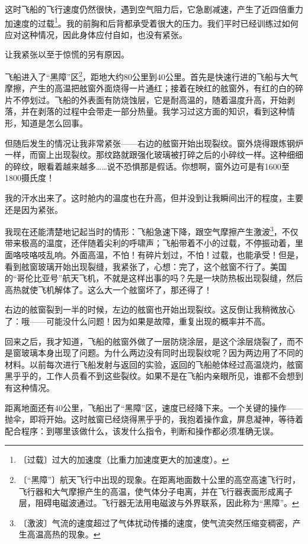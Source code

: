 \documentclass[12pt,UTF-8,openany]{ctexbook}
\begin{document}
\begin{large}
    这时飞船的飞行速度仍然很快，遇到空气阻力后，它急剧减速，产生了近四倍重力加速度的过载\footnote{〔过载〕过大的加速度（比重力加速度更大的加速度）。}。我的前胸和后背都承受着很大的压力。我们平时已经训练过如何应对这种情况，因此身体应付自如，也没有紧张。
    
    让我紧张以至于惊慌的另有原因。
    
    飞船进入了“黑障”区\footnote{〔“黑障”〕航天飞行中出现的现象。在距离地面数十公里的高空高速飞行时，飞行器和大气摩擦产生的高温，使气体分子电离，并在飞行器表面形成离子层，阻碍电磁波通过。飞行器无法用电磁波与外界联系，因此称为“黑障”。}，距地大约80公里到40公里。首先是快速行进的飞船与大气摩擦，产生的高温把舷窗外面烧得一片通红；接着在映红的舷窗外，有红的白的碎片不停划过。飞船的外表面有防烧蚀层，它是耐高温的，随着温度升高，开始剥落，并在剥落的过程中会带走一部分热量。我学习过这方面的知识，看到这种情形，知道是怎么回事。
    
    但随后发生的情况让我非常紧张——右边的舷窗开始出现裂纹。窗外烧得跟炼钢炉一样，而窗上出现裂纹。那纹路就跟强化玻璃被打碎之后的小碎纹一样。这种细细的碎纹，眼看着越来越多……说不恐惧那是假话。你想啊，窗外边可是有1600至1800摄氏度！
    
    我的汗水出来了。这时舱内的温度也在升高，但并没到让我瞬间出汗的程度，主要还是因为紧张。
    
    我现在还能清楚地记起当时的情形：飞船急速下降，跟空气摩擦产生激波\footnote{〔激波〕气流的速度超过了气体扰动传播的速度，使气流突然压缩变稠密，产生高温高热的现象。}，不仅带来极高的温度，还伴随着尖利的呼啸声；飞船带着不小的过载，不停振动着，里面咯吱咯吱乱响。外面高温，不怕！有碎片划过，不怕！过载，也能承受！但是，看到舷窗玻璃开始出现裂缝，我紧张了，心想：完了，这个舷窗不行了。美国的“哥伦比亚号”航天飞机，不就是这样出事的吗？先是一块防热板出现裂缝，然后高热就使飞机解体了。这么大一个舷窗坏了，那还得了！
    
    右边的舷窗裂到一半的时候，左边的舷窗也开始出现裂纹。这反倒让我稍微放心了：哦——可能没什么问题！因为如果是故障，重复出现的概率并不高。
    
    回来之后，我才知道，飞船的舷窗外做了一层防烧涂层，是这个涂层烧裂了，而不是窗玻璃本身出现了问题。为什么两边没有同时出现裂纹呢？因为两边用了不同的材料。以前每次进行飞船发射与返回的实验，返回的飞船舱体经过高温烧灼，舷窗黑乎乎的，工作人员看不到这些裂纹。如果不是在飞船内亲眼所见，谁都不会想到有这种情况。
    
    距离地面还有40公里，飞船出了“黑障”区，速度已经降下来。一个关键的操作——抛伞，即将开始。这时舷窗已经烧得黑乎乎的，我抱着操作盒，屏息凝神，等待着配合程序：到哪里该做什么，该发什么指令，判断和操作都必须准确无误。
    

\end{large}
\end{document}
